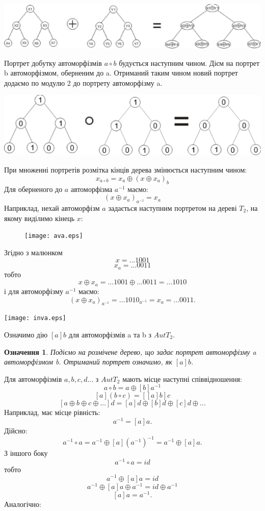 \documentclass[a4paper,12pt]{article} \usepackage{a4wide}
\numberwithin{equation}{subsection}
\newtheorem{definition}{Означення}[subsection]
\begin{document}
\begin{center}
\includegraphics[scale=0.7]{SumTr.eps}
\end{center}
Портрет добутку автоморфізмів $a\circ b$ будується наступним чином. Дієм на портрет b автоморфізмом, оберненим до a. Отриманий таким чином новий портрет додаємо по модулю 2 до портрету автоморфізму a.



\begin{center}
\includegraphics[scale=0.4]{MultTree1.eps}
\end{center}

При множенні портретів розмітка кінців дерева змінюється наступним чином:
$$x_{a\circ b}=x_a\oplus (x \oplus x_a)_b$$
Для оберненого до $a$ автоморфізма $a^{-1}$ маємо:
$$(x\oplus x_a)_{a^{-1}}=x_a$$
Наприклад, нехай автоморфізм $a$ задається наступним портретом на дереві $T_2$, на якому виділимо кінець $x$:
\begin{center}
\begin{figure}
\texttt{[image: ava.eps]}
\caption{}
\end{figure}
\end{center}
Згідно з малюнком $$x=...1001$$ $$x_a=...0011$$ тобто $$x\oplus
x_a=...1001\oplus ...0011=...1010$$ і для автоморфізму $a^{-1}$
маємо:$$(x\oplus x_a)_{a^{-1}}=...1010_{a^{-1}}=x_a=...0011.$$
\begin{center}
\texttt{[image: inva.eps]}
\end{center}



Означимо дію $[a]b$ для автоморфізмів a та b з $AutT_2$.
\begin{definition}
Подіємо на розмічене дерево, що задає портрет автоморфізму a автоморфізмом b. Отриманий портрет означимо, як $[a]b$.
\end{definition}
 Для автоморфізмів $a,b,c,d...$ з $AutT_2$ мають місце наступні співвідношення:
$$a \circ b=a \oplus [b]a^{-1}$$
$$[a](b \circ c)=[[a]b]c$$
$$[a\oplus b\oplus c\oplus ...]d=[a]d\oplus [b]d\oplus [c]d\oplus ...$$
Наприклад, має місце рівність:
$$a^{-1}=[a]a.$$
Дійсно: $$a^{-1}\circ a= a^{-1}\oplus [a](a^{-1})^{-1}=a^{-1}\oplus [a]a.$$
З іншого боку $$a^{-1}\circ a=id$$
тобто
$$a^{-1} \oplus [a]a = id$$
$$a^{-1} \oplus [a]a \oplus a^{-1}=id \oplus a^{-1}$$
$$[a]a=a^{-1}.$$
 Аналогічно:
\end{document}
